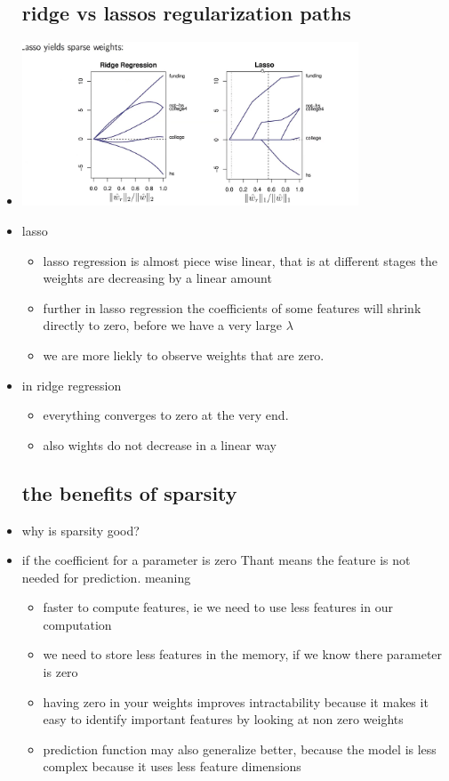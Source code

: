 \documentclass{article}
\begin{document}
\begin{itemize}
\subsection{ridge vs lassos regularization paths}
\item \includegraphics[width=10cm]{lecture_notes/lecture_3/immages/l3_4.jpg}
\item lasso
\begin{itemize}
\item lasso regression is almost piece wise linear, that is at different stages the weights are decreasing by a linear amount 
\item further in lasso regression the coefficients of some features will shrink directly to zero, before we have a very large $\lambda$
\item we are more liekly to observe weights that are zero. 
\end{itemize}
\item in ridge regression 
\begin{itemize}
    \item everything converges to zero at the very end.
    \item also wights do not decrease in a linear way 
\end{itemize}


\subsection{the benefits of sparsity}
\item why is sparsity good? 
\item if the coefficient for a parameter is zero Thant means the feature is not needed for prediction. meaning 
\begin{itemize}
    \item faster to compute features, ie we need to use less features in our computation 
    \item we need to store less features in the memory, if we know there parameter is zero
    \item having zero in your weights improves intractability because it makes it easy to identify important features by looking at non zero weights
    \item prediction function may also generalize better, because the model is less complex because it uses less feature dimensions 
\end{itemize}

\end{itemize}
\end{document}
